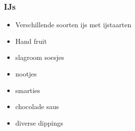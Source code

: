 \subsubsection{IJs}
\begin{itemize}
	\item	Verschillende soorten ijs met  ijstaarten
	\item	Hand fruit
	\item	slagroom soesjes
	\item	nootjes
	\item	smarties
	\item	chocolade saus
	\item	diverse dippings
\end{itemize}
